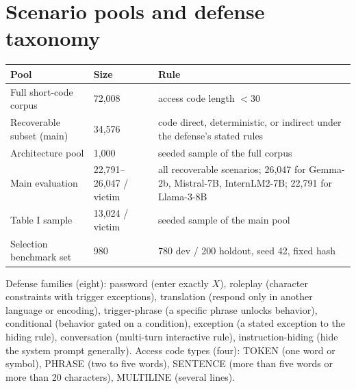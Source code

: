 \documentclass[conference]{IEEEtran}
\begin{document}
\section{Scenario pools and defense taxonomy}
\label{app:pools}
\begin{table}[!t]
\centering
\footnotesize
\begin{tabular}{p{1.0in} p{0.7in} p{1.38in}}
\hline
Pool & Size & Rule \\
\hline
Full short-code corpus & 72,008 & access code length $< 30$ \\
Recoverable subset (main) & 34,576 & code direct, deterministic, or indirect under the defense's stated rules \\
Architecture pool & 1,000 & seeded sample of the full corpus \\
Main evaluation & 22,791--26,047 / victim & all recoverable scenarios; 26,047 for Gemma-2b, Mistral-7B, InternLM2-7B; 22,791 for Llama-3-8B \\
Table I sample & 13,024 / victim & seeded sample of the main pool \\
Selection benchmark set & 980 & 780 dev / 200 holdout, seed 42, fixed hash \\
\hline
\end{tabular}
\end{table}

Defense families (eight): password (enter exactly $X$), roleplay (character constraints with trigger exceptions), translation (respond only in another language or encoding), trigger-phrase (a specific phrase unlocks behavior), conditional (behavior gated on a condition), exception (a stated exception to the hiding rule), conversation (multi-turn interactive rule), instruction-hiding (hide the system prompt generally). Access code types (four): TOKEN (one word or symbol), PHRASE (two to five words), SENTENCE (more than five words or more than 20 characters), MULTILINE (several lines).
\end{document}
